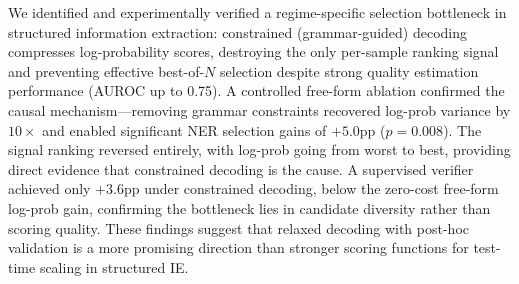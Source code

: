 \documentclass[11pt,a4paper]{article}
\begin{document}
We identified and experimentally verified a regime-specific selection bottleneck in structured information extraction: constrained (grammar-guided) decoding compresses log-probability scores, destroying the only per-sample ranking signal and preventing effective best-of-$N$ selection despite strong quality estimation performance (AUROC up to 0.75). A controlled free-form ablation confirmed the causal mechanism---removing grammar constraints recovered log-prob variance by $10\times$ and enabled significant NER selection gains of $+5.0$pp ($p = 0.008$). The signal ranking reversed entirely, with log-prob going from worst to best, providing direct evidence that constrained decoding is the cause. A supervised verifier achieved only $+3.6$pp under constrained decoding, below the zero-cost free-form log-prob gain, confirming the bottleneck lies in candidate diversity rather than scoring quality. These findings suggest that relaxed decoding with post-hoc validation is a more promising direction than stronger scoring functions for test-time scaling in structured IE.


\end{document}
